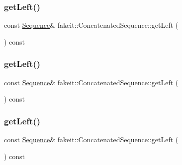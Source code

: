 \subsubsection{\texorpdfstring{getLeft()}{getLeft()}\hspace{0.1cm}{\footnotesize\ttfamily [3/9]}}
{\footnotesize\ttfamily const \mbox{\hyperlink{classfakeit_1_1Sequence}{Sequence}}\& fakeit\+::\+Concatenated\+Sequence\+::get\+Left (\begin{DoxyParamCaption}{ }\end{DoxyParamCaption}) const\hspace{0.3cm}{\ttfamily [inline]}}

\mbox{\label{classfakeit_1_1ConcatenatedSequence_aee102fbcc892783441a36082e1a22789}} 
\subsubsection{\texorpdfstring{getLeft()}{getLeft()}\hspace{0.1cm}{\footnotesize\ttfamily [4/9]}}
{\footnotesize\ttfamily const \mbox{\hyperlink{classfakeit_1_1Sequence}{Sequence}}\& fakeit\+::\+Concatenated\+Sequence\+::get\+Left (\begin{DoxyParamCaption}{ }\end{DoxyParamCaption}) const\hspace{0.3cm}{\ttfamily [inline]}}

\mbox{\label{classfakeit_1_1ConcatenatedSequence_aee102fbcc892783441a36082e1a22789}} 
\subsubsection{\texorpdfstring{getLeft()}{getLeft()}\hspace{0.1cm}{\footnotesize\ttfamily [5/9]}}
{\footnotesize\ttfamily const \mbox{\hyperlink{classfakeit_1_1Sequence}{Sequence}}\& fakeit\+::\+Concatenated\+Sequence\+::get\+Left (\begin{DoxyParamCaption}{ }\end{DoxyParamCaption}) const\hspace{0.3cm}{\ttfamily [inline]}}


